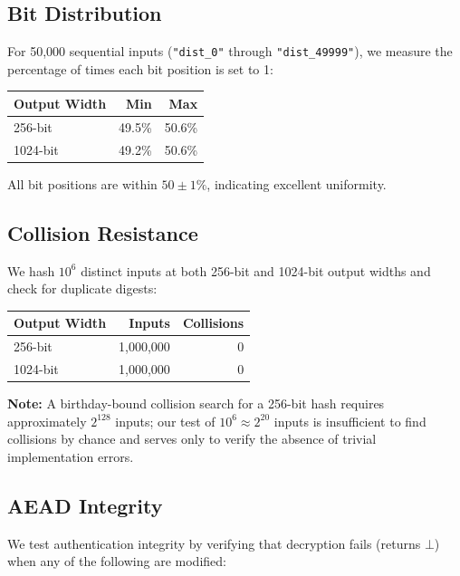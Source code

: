 \documentclass[11pt,a4paper]{article}
\newcommand{\toprule}{\hline}
\newcommand{\midrule}{\hline}
\newcommand{\bottomrule}{\hline}
\begin{document}
\subsection{Bit Distribution}

For 50,000 sequential inputs (\texttt{"dist\_0"} through
\texttt{"dist\_49999"}), we measure the percentage of times each bit
position is set to 1:

\begin{center}
\begin{tabular}{|l|r|r|}
\toprule
\textbf{Output Width} & \textbf{Min} & \textbf{Max} \\
\midrule
256-bit  & 49.5\% & 50.6\% \\
1024-bit & 49.2\% & 50.6\% \\
\bottomrule
\end{tabular}
\end{center}

All bit positions are within $50 \pm 1\%$, indicating excellent
uniformity.

\subsection{Collision Resistance}

We hash $10^6$ distinct inputs at both 256-bit and 1024-bit output
widths and check for duplicate digests:

\begin{center}
\begin{tabular}{|l|r|r|}
\toprule
\textbf{Output Width} & \textbf{Inputs} & \textbf{Collisions} \\
\midrule
256-bit  & 1,000,000 & 0 \\
1024-bit & 1,000,000 & 0 \\
\bottomrule
\end{tabular}
\end{center}

\textbf{Note:} A birthday-bound collision search for a 256-bit hash
requires approximately $2^{128}$ inputs; our test of
$10^6 \approx 2^{20}$ inputs is insufficient to find collisions by
chance and serves only to verify the absence of trivial implementation
errors.

\subsection{AEAD Integrity}

We test authentication integrity by verifying that decryption fails
(returns $\bot$) when any of the following are modified:
\end{document}
